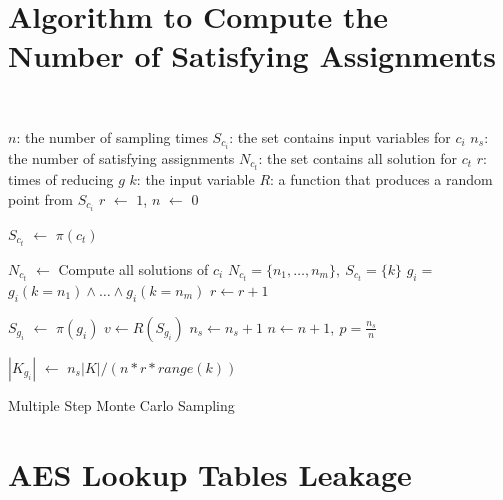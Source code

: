 \section{Algorithm to Compute the Number of Satisfying Assignments}
\label{appendix:montecarlo}
~
{\small
\IncMargin{1em}
\begin{algorithm}\small
    \SetAlgoLined
    \DontPrintSemicolon


    $n$: the number of sampling times \;
    $S_{c_i}$: the set contains input variables for $c_{i}$ \;
    $n_{s}$: the number of satisfying assignments \;
    $N_{c_t}$: the set contains all solution for $c_t$ \;
    $r$: times of reducing $g$\;
    $k$: the input variable \;
    $R$: a function that produces a random point from $S_{c_i}$\;
    $r$ $\leftarrow$ $1$,
    $n$ $\leftarrow$ $0$ \;
     {
        $S_{c_t}$ $\leftarrow$ $\pi(c_t)$ \;
        {
            $N_{c_t}$ $\leftarrow$ Compute all solutions of $c_i$ \;
            $N_{c_t} = \{n_1, \ldots, n_m\},\ S_{c_t} = \{k\}  $ \;
            $g_{i} = $ $g_i(k=n_1) \land \ldots \land g_i(k=n_m)$ \;
            $r \leftarrow r+1$ \;

        }
    }
     {
        $S_{g_i}$ $\leftarrow$ $\pi(g_i)$ \;
        $v \leftarrow R(S_{g_i})$ 
        {
           $n_s \leftarrow n_s + 1$
        }
        $n \leftarrow n +1,\ p = \frac{n_s}{n}$
    }

    $|K_{g_{i}}|$ $\leftarrow$ $n_s|K| / (n * r * range(k))$
    \caption{Multiple Step Monte Carlo Sampling}
\end{algorithm}
\DecMargin{1em}
}


\section{AES Lookup Tables Leakage}

